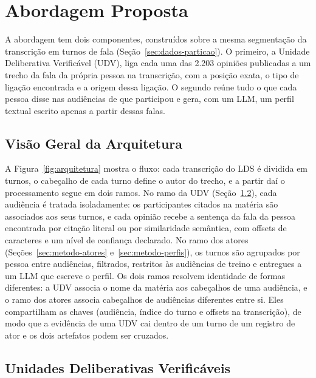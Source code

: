 \section{Abordagem Proposta}
\label{sec:metodo}

A abordagem tem dois componentes, construídos sobre a mesma segmentação da transcrição em turnos de
fala (Seção~\ref{sec:dados-particao}). O primeiro, a Unidade Deliberativa Verificável (UDV), liga cada
uma das 2.203 opiniões publicadas a um trecho da fala da própria pessoa na transcrição, com a posição
exata, o tipo de ligação encontrada e a origem dessa ligação. O segundo reúne tudo o que cada pessoa
disse nas audiências de que participou e gera, com um LLM, um perfil textual escrito apenas a partir
dessas falas.

\subsection{Vis\~ao Geral da Arquitetura}
\label{sec:metodo-visao}



A Figura~\ref{fig:arquitetura} mostra o fluxo: cada transcrição do LDS é dividida em turnos, o
cabeçalho de cada turno define o autor do trecho, e a partir daí o processamento segue em dois ramos. No ramo da UDV
(Seção~\ref{sec:metodo-udv}), cada audiência é tratada isoladamente: os participantes citados na
matéria são associados aos seus turnos, e cada opinião recebe a sentença da fala da pessoa encontrada
por citação literal ou por similaridade semântica, com offsets de caracteres e um nível de confiança
declarado. No ramo dos atores (Seções~\ref{sec:metodo-atores} e~\ref{sec:metodo-perfis}), os turnos
são agrupados por pessoa entre audiências, filtrados, restritos às audiências de treino e entregues a
um LLM que escreve o perfil. Os dois ramos resolvem identidade de formas diferentes: a UDV associa o
nome da matéria aos cabeçalhos de uma audiência, e o ramo dos atores associa cabeçalhos de audiências
diferentes entre si. Eles compartilham as chaves (audiência, índice do turno e offsets na transcrição),
de modo que a evidência de uma UDV cai dentro de um turno de um registro de ator e os dois artefatos
podem ser cruzados.

\subsection{Unidades Deliberativas Verificáveis}
\label{sec:metodo-udv}

